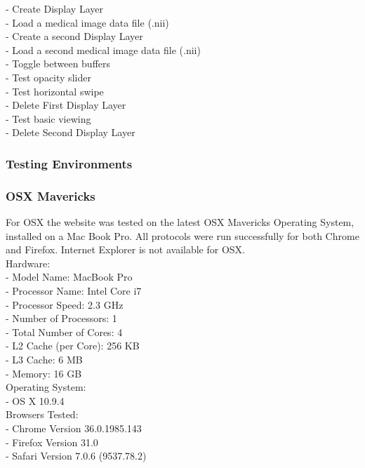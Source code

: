 \documentclass[a4paper,11pt,titlepage]{article}
\begin{document}
- Create Display Layer\\
- Load a medical image data file (.nii)\\
- Create a second Display Layer\\
- Load a second medical image data file (.nii)\\
- Toggle between buffers\\
- Test opacity slider\\
- Test horizontal swipe\\
- Delete First Display Layer\\
- Test basic viewing\\
- Delete Second Display Layer




\subsubsection{Testing Environments}


\subsubsection*{OSX Mavericks}

For OSX the website was tested on the latest OSX Mavericks Operating System, installed on a Mac Book Pro. All protocols were run successfully for both Chrome and Firefox.  Internet Explorer is not available for OSX.\\

\noindent Hardware:\\
- Model Name:	MacBook Pro\\
- Processor Name:	Intel Core i7\\
- Processor Speed:	2.3 GHz\\
- Number of Processors:	1\\
- Total Number of Cores:	4\\
- L2 Cache (per Core):	256 KB\\
- L3 Cache:	6 MB\\
- Memory:	16 GB\\


\noindent Operating System:\\
- OS X 10.9.4\\

\noindent Browsers Tested:\\
- Chrome Version 36.0.1985.143\\
- Firefox Version 31.0\\
- Safari Version 7.0.6 (9537.78.2)\\
\end{document}
